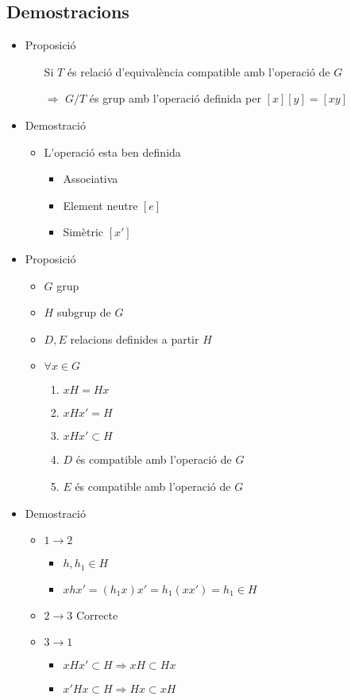\documentclass{article}
\begin{document}
\subsection*{Demostracions}
\begin{itemize}
\item Proposició
	\begin{itemize}
	\item[Si] $T$ és relació d'equivalència compatible amb l'operació de $G$
	\item[$\Rightarrow$] $G/T$ és grup amb l'operació definida per
		\subitem $[x][y] = [xy]$
	\end{itemize}
\item Demostració
	\begin{itemize}
	\item L'operació esta ben definida
		\begin{itemize}
		\item Associativa
		\item Element neutre $[e]$
		\item Simètric $[x']$
		\end{itemize}
	\end{itemize}
\item Proposició
	\begin{itemize}
	\item $G$ grup
	\item $H$ subgrup de $G$
	\item $D, E$ relacions definides a partir $H$
	\item $\forall x \in G$
		\begin{enumerate}
		\item $xH = Hx$
		\item $xHx' = H$
		\item $xHx' \subset H$
		\item $D$ és compatible amb l'operació de $G$
		\item $E$ és compatible amb l'operació de $G$
		\end{enumerate}
	\end{itemize}
\item Demostració
	\begin{itemize}
	\item $1 \to 2$
		\begin{itemize}
		\item $h, h_1 \in H$
		\item $xhx' = (h_1x)x' = h_1 (xx') = h_1 \in H$
		\end{itemize}
	\item $2 \to 3$ Correcte
	\item $3 \to 1$
		\begin{itemize}
		\item $xHx' \subset H \Rightarrow xH \subset Hx$
		\item $x'Hx \subset H \Rightarrow Hx \subset xH$
		\end{itemize}
	\end{itemize}
\end{itemize}
\end{document}
